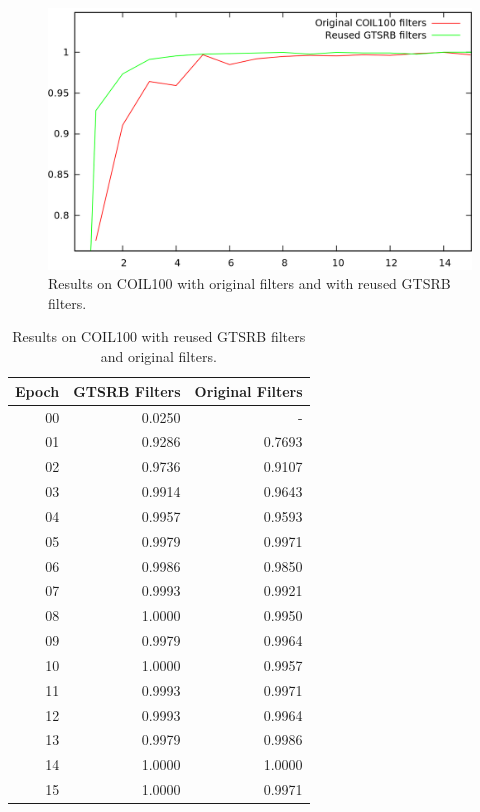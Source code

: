 \documentclass[11pt, a4paper]{article}
\begin{document}
\begin{figure}[h!]
	\centering
	\includegraphics[width=1\textwidth]{coil100_results.png}
	\caption{Results on COIL100 with original filters and with reused GTSRB filters.}
	\label{fig:coil100_results}
\end{figure}
\begin{table}[h!]
	\centering
	\begin{tabular}{|r|rr|}
		\hline
		Epoch & GTSRB Filters & Original Filters\\ \hline
		00 & 0.0250 & -\\
		01 & 0.9286 & 0.7693\\
		02 & 0.9736 & 0.9107\\
		03 & 0.9914 & 0.9643\\
		04 & 0.9957 & 0.9593\\
		05 & 0.9979 & 0.9971\\
		06 & 0.9986 & 0.9850\\
		07 & 0.9993 & 0.9921\\
		08 & 1.0000 & 0.9950\\
		09 & 0.9979 & 0.9964\\
		10 & 1.0000 & 0.9957\\
		11 & 0.9993 & 0.9971\\
		12 & 0.9993 & 0.9964\\
		13 & 0.9979 & 0.9986\\
		14 & 1.0000 & 1.0000\\
		15 & 1.0000 & 0.9971\\ \hline
	\end{tabular}

	\caption{Results on COIL100 with reused GTSRB filters and original filters.}
	\label{tab:coil-results}
\end{table}
\end{document}
